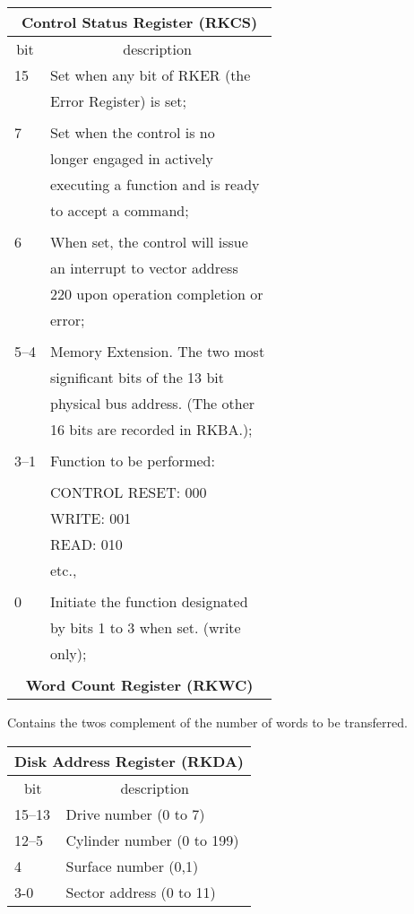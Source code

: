 \begin{tabular}{ll}
\multicolumn{2}{c}{\bf Control Status Register (RKCS)}\\ \hline
\multicolumn{1}{c}{bit} & \multicolumn{1}{c}{description}
\\
15 & Set when any bit of RKER (the\\
   & Error Register) is set;\\
\\
7  & Set when the control is no\\
   & longer engaged in actively\\
   & executing a function and is ready\\
   & to accept a command;\\
\\
6  & When set, the control will issue\\
   & an interrupt to vector address\\
   & 220 upon operation completion or\\
   & error;\\
\\
5--4 & Memory Extension. The two most\\
   & significant bits of the 13 bit\\
   & physical bus address. (The other\\
   & 16 bits are recorded in RKBA.);\\
\\
3--1 & Function to be performed:\\
\\
   & CONTROL RESET: 000\\
   & WRITE: 001\\
   & READ: 010\\
   & etc.,\\
\\
0 & Initiate the function designated\\
 & by bits 1 to 3 when set. (write\\
 & only);\\
\\
\multicolumn{2}{c}{\bf Word Count Register (RKWC)}\\ \hline
\end{tabular}

Contains the twos complement of the
number of words to be transferred.

\bigskip

\begin{tabular}{ll}
\multicolumn{2}{c}{\bf Disk Address Register (RKDA)}\\ \hline
\multicolumn{1}{c}{bit} & \multicolumn{1}{c}{description}
\\
15--13 & Drive number (0 to 7)\\
12--5 & Cylinder number (0 to 199)\\
 4 & Surface number (0,1)\\
 3-0 & Sector address (0 to 11)\\
\end{tabular}
 

